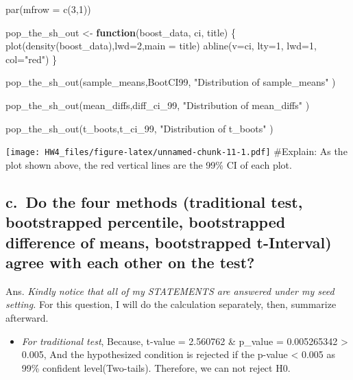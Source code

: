 \documentclass[
]{article}
\newenvironment{Shaded}{\begin{snugshade}}{\end{snugshade}}
\newcommand{\AttributeTok}[1]{\textcolor[rgb]{0.77,0.63,0.00}{#1}}
\newcommand{\ControlFlowTok}[1]{\textcolor[rgb]{0.13,0.29,0.53}{\textbf{#1}}}
\newcommand{\DecValTok}[1]{\textcolor[rgb]{0.00,0.00,0.81}{#1}}
\newcommand{\FunctionTok}[1]{\textcolor[rgb]{0.00,0.00,0.00}{#1}}
\newcommand{\NormalTok}[1]{#1}
\newcommand{\OtherTok}[1]{\textcolor[rgb]{0.56,0.35,0.01}{#1}}
\newcommand{\StringTok}[1]{\textcolor[rgb]{0.31,0.60,0.02}{#1}}
\providecommand{\tightlist}{%
  \setlength{\itemsep}{0pt}\setlength{\parskip}{0pt}}
\begin{document}
\begin{Shaded}
\begin{Highlighting}[]
\FunctionTok{par}\NormalTok{(}\AttributeTok{mfrow =} \FunctionTok{c}\NormalTok{(}\DecValTok{3}\NormalTok{,}\DecValTok{1}\NormalTok{)) }

\NormalTok{pop\_the\_sh\_out }\OtherTok{\textless{}{-}} \ControlFlowTok{function}\NormalTok{(boost\_data, ci, title) \{}
\FunctionTok{plot}\NormalTok{(}\FunctionTok{density}\NormalTok{(boost\_data),}\AttributeTok{lwd=}\DecValTok{2}\NormalTok{,}\AttributeTok{main =}\NormalTok{ title)}
\FunctionTok{abline}\NormalTok{(}\AttributeTok{v=}\NormalTok{ci, }\AttributeTok{lty=}\DecValTok{1}\NormalTok{, }\AttributeTok{lwd=}\DecValTok{1}\NormalTok{, }\AttributeTok{col=}\StringTok{"red"}\NormalTok{)}
\NormalTok{\}}


\FunctionTok{pop\_the\_sh\_out}\NormalTok{(sample\_means,BootCI99, }\StringTok{"Distribution of sample\_means"}\NormalTok{ )}

\FunctionTok{pop\_the\_sh\_out}\NormalTok{(mean\_diffs,diff\_ci\_99, }\StringTok{"Distribution of mean\_diffs"}\NormalTok{ )}

\FunctionTok{pop\_the\_sh\_out}\NormalTok{(t\_boots,t\_ci\_99, }\StringTok{"Distribution of t\_boots"}\NormalTok{ )}
\end{Highlighting}
\end{Shaded}

\texttt{[image: HW4\_files/figure-latex/unnamed-chunk-11-1.pdf]}
\#Explain: As the plot shown above, the red vertical lines are the 99\%
CI of each plot.

\hypertarget{c.-do-the-four-methods-traditional-test-bootstrapped-percentile-bootstrapped-difference-of-means-bootstrapped-t-interval-agree-with-each-other-on-the-test}{%
\subsection{c.~Do the four methods (traditional test, bootstrapped
percentile, bootstrapped difference of means, bootstrapped t-Interval)
agree with each other on the
test?}\label{c.-do-the-four-methods-traditional-test-bootstrapped-percentile-bootstrapped-difference-of-means-bootstrapped-t-interval-agree-with-each-other-on-the-test}}

Ans. \emph{Kindly notice that all of my STATEMENTS are answered under my
seed setting.} For this question, I will do the calculation separately,
then, summarize afterward.

\begin{itemize}
\tightlist
\item
  \emph{For traditional test}, Because, t-value = 2.560762 \& p\_value =
  0.005265342 \textgreater{} 0.005, And the hypothesized condition is
  rejected if the p-value \textless{} 0.005 as 99\% confident
  level(Two-tails). Therefore, we can not reject H0.
\end{itemize}
\end{document}
